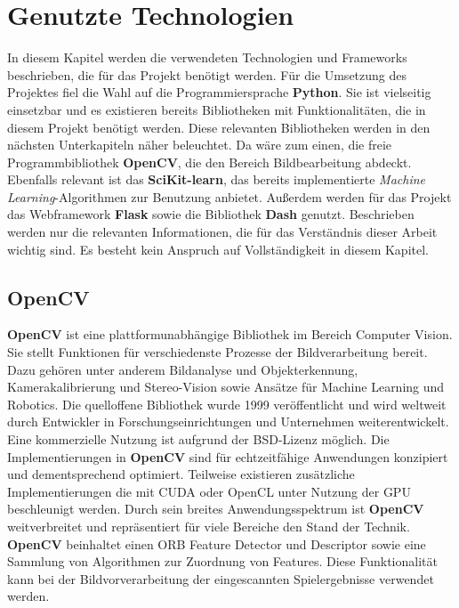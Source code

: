 \section{Genutzte Technologien}
In diesem Kapitel werden die verwendeten Technologien und Frameworks beschrieben, die für das Projekt benötigt werden.
Für die Umsetzung des Projektes fiel die Wahl auf die Programmiersprache \textbf{Python}. Sie ist vielseitig einsetzbar und es existieren bereits Bibliotheken mit
Funktionalitäten, die in diesem Projekt benötigt werden. Diese relevanten Bibliotheken werden in den nächsten Unterkapiteln näher beleuchtet.
Da wäre zum einen, die freie Programmbibliothek \textbf{OpenCV}, die den Bereich Bildbearbeitung abdeckt. Ebenfalls relevant ist das \textbf{SciKit-learn}, das
bereits implementierte \textit{Machine Learning}-Algorithmen zur Benutzung anbietet. Außerdem werden für das Projekt das Webframework \textbf{Flask} sowie
die Bibliothek \textbf{Dash} genutzt. Beschrieben werden nur die relevanten Informationen, die für das Verständnis dieser Arbeit wichtig sind.
Es besteht kein Anspruch auf Vollständigkeit in diesem Kapitel.

\subsection{OpenCV}
\textbf{OpenCV} ist eine plattformunabhängige Bibliothek im Bereich Computer Vision. Sie stellt Funktionen für verschiedenste Prozesse der Bildverarbeitung bereit.
Dazu gehören unter anderem Bildanalyse und Objekterkennung, Kamerakalibrierung und Stereo-Vision sowie Ansätze für Machine Learning und Robotics.
Die quelloffene Bibliothek wurde 1999 veröffentlicht und wird weltweit durch Entwickler in Forschungseinrichtungen und Unternehmen weiterentwickelt.
Eine kommerzielle Nutzung ist aufgrund der BSD-Lizenz möglich. Die Implementierungen in \textbf{OpenCV} sind für echtzeitfähige Anwendungen konzipiert
und dementsprechend optimiert.
Teilweise existieren zusätzliche Implementierungen die mit CUDA oder OpenCL unter Nutzung der GPU beschleunigt werden.
Durch sein breites Anwendungsspektrum ist \textbf{OpenCV} weitverbreitet und repräsentiert für viele Bereiche den Stand der Technik.
\textbf{OpenCV} beinhaltet einen ORB Feature Detector und Descriptor sowie eine Sammlung von Algorithmen zur Zuordnung von Features.
Diese Funktionalität kann bei der Bildvorverarbeitung der eingescannten Spielergebnisse verwendet werden.

